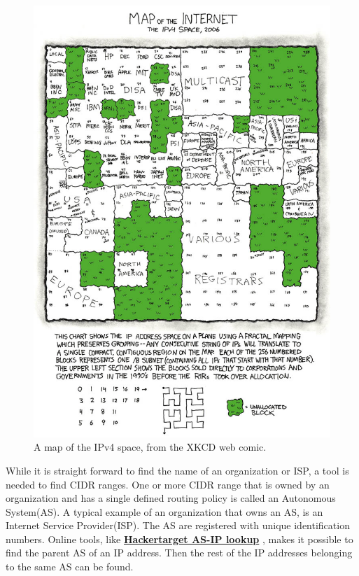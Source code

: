 \begin{figure} [H]
    \centering
    \includegraphics[scale=4]{Figurer/map_of_the_internet.jpg}
    \caption{A map of the IPv4 space, from the XKCD web comic. \cite{xkcd} }
    \label{fig:ipv4_map}
\end{figure}

While it is straight forward to find the name of an organization or ISP, a tool is needed to find CIDR ranges. One or more CIDR range that is owned by an organization and has a single defined routing policy is called an Autonomous System(AS). A typical example of an organization that owns an AS, is an Internet Service Provider(ISP). \cite{AS_def} 
The AS are registered with unique identification numbers. Online tools, like \href{https://hackertarget.com/as-ip-lookup/}{\textbf{Hackertarget AS-IP lookup}} \cite{asip_lookup}, makes it possible to find the parent AS of an IP address. Then the rest of the IP addresses belonging to the same AS can be found.


